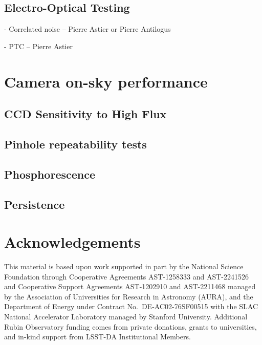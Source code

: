 \documentclass[OPS,lsstdraft,authoryear,toc]{lsstdoc}
\begin{document}
\subsection{Electro-Optical Testing}



- Correlated noise -- Pierre Astier or Pierre Antilogus

- PTC -- Pierre Astier
\newpage
\section{Camera on-sky performance}\label{sec:performance}

\subsection{CCD Sensitivity to High Flux}\label{subsec:bright_star_test}


\clearpage

\subsection{Pinhole repeatability tests}


\clearpage

\subsection{Phosphorescence}\label{subsec:on_sky_phosphorescence}


\clearpage

\subsection{Persistence}\label{subsec:on_sky_persistence}


\clearpage



\section{Acknowledgements}

This material is based upon work supported in part by the National Science Foundation through Cooperative Agreements AST-1258333 and AST-2241526 and Cooperative Support Agreements AST-1202910 and AST-2211468 managed by the Association of Universities for Research in Astronomy (AURA), and the Department of Energy under Contract No.\ DE-AC02-76SF00515 with the SLAC National Accelerator Laboratory managed by Stanford University.
Additional Rubin Observatory funding comes from private donations, grants to universities, and in-kind support from LSST-DA Institutional Members.
\end{document}
